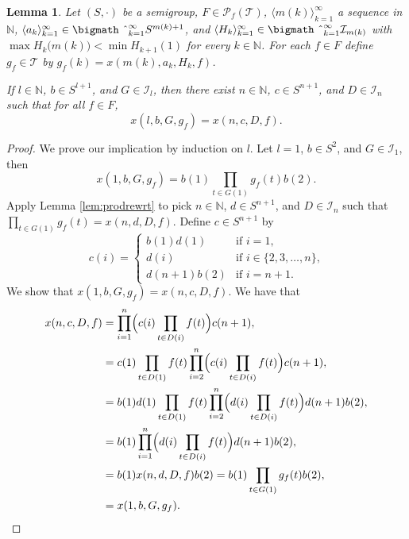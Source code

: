 \documentclass[12pt]{article}
\theoremstyle{plain}
\newtheorem{lem}[thm]{Lemma}
\theoremstyle{definition}
\newcommand{\la}{\langle}
\newcommand{\ra}{\rangle}
\newcommand{\bbN}{\mathbb{N}}
\newcommand{\calI}{\mathcal{I}}
\newcommand{\calT}{\mathcal{T}}
\newcommand{\Pf}{\mathcal{P}_f}
\newcommand{\bigtimes}{\hbox{\bigmath \char'2}}
\begin{document}
\begin{lem}
  Let $(S, \cdot)$ be  a semigroup, $F \in \Pf(\calT)$, $\la m(k)
  \ra_{k=1}^\infty$ a sequence in $\bbN$, $\la a_k \ra_{k=1}^\infty
  \in \bigtimes_{k=1}^\infty S^{m(k)+1}$, and $\la H_k
  \ra_{k=1}^\infty \in \bigtimes_{k=1}^\infty \calI_{m(k)}$ with $\max
  H_k\bigl(m(k)\bigr) < \min H_{k+1}(1)$ for every $k \in \bbN$.
  For each $f \in F$ define $g_f \in \calT$ by $g_f(k) = x(m(k), a_k,
  H_k, f)$. 
  
  If $l \in \bbN$, $b \in S^{l+1}$, and $G \in \calI_l$, then there
  exist $n \in \bbN$, $c \in S^{n+1}$, and $D \in \calI_n$ such that
  for all $f \in F$, 
  \[
    x(l, b, G, g_f) = x(n, c, D, f).
  \]
\end{lem}
\begin{proof}
  We prove our implication by induction on $l$.
  Let $l = 1$, $b \in S^{2}$, and $G \in \calI_1$, then
  \[
    x(1, b, G, g_f) = b(1) \prod_{t \in G(1)} g_f(t) b(2).
  \]
  Apply Lemma \ref{lem:prodrewrt} to pick $n \in \bbN$, $d \in
  S^{n+1}$, and $D \in \calI_n$ such that $\prod_{t \in G(1)} g_f(t) =
  x(n, d, D, f)$.
  Define $c \in S^{n+1}$ by
  \[
    c(i) =
    \begin{cases}
      b(1)d(1) & \mbox{if $i = 1$,} \\
      d(i) & \mbox{if $i \in \{2, 3, \ldots, n \}$,} \\
      d(n+1)b(2) & \mbox{if $i = n+1$.}
    \end{cases}
  \]
  We show that $x(1, b, G, g_f) = x(n, c, D, f)$.
  We have that
  \begin{align*}
    x(n, c, D, f) &= \prod_{i=1}^n\Bigl(c(i) \prod_{t \in D(i)} f(t)
    \Bigr)c(n+1), \\
    &= c(1)\prod_{t \in D(1)} f(t) \prod_{i=2}^n\Bigl(c(i) \prod_{t
      \in D(i)} f(t) \Bigr) c(n+1), \\
    &= b(1)d(1) \prod_{t \in D(1)} f(t)
    \prod_{i=2}^n\Bigl(d(i)\prod_{t \in D(i)} f(t) \Bigr) d(n+1)b(2),
    \\
    &= b(1) \prod_{i=1}^n\Bigl(d(i) \prod_{t \in D(i)} f(t) \Bigr)
    d(n+1) b(2), \\
    &= b(1) x(n, d, D, f)b(2) = b(1) \prod_{t \in G(1)} g_f(t) b(2),
    \\
    &= x(1, b, G, g_f).
  \end{align*}


\end{proof}
\end{document}
